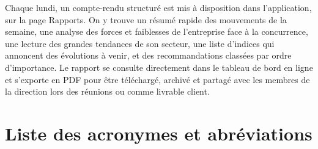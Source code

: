 \documentclass[12pt,a4paper,openany]{report}
\begin{document}
Chaque lundi, un compte-rendu structuré est mis à disposition dans l'application, sur la page Rapports. On y trouve un résumé rapide des mouvements de la semaine, une analyse des forces et faiblesses de l'entreprise face à la concurrence, une lecture des grandes tendances de son secteur, une liste d'indices qui annoncent des évolutions à venir, et des recommandations classées par ordre d'importance. Le rapport se consulte directement dans le tableau de bord en ligne et s'exporte en PDF pour être téléchargé, archivé et partagé avec les membres de la direction lors des réunions ou comme livrable client.

\tableofcontents
\listoffigures
\listoftables

\chapter*{Liste des acronymes et abréviations}
\end{document}
